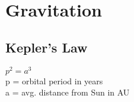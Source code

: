 \documentclass[12pt]{article}
\begin{document}
\section{Gravitation}
\subsection{Kepler's Law}
$p^2=a^3$ \\
p = orbital period in years \\
a = avg. distance from Sun in AU \\
\end{document}
